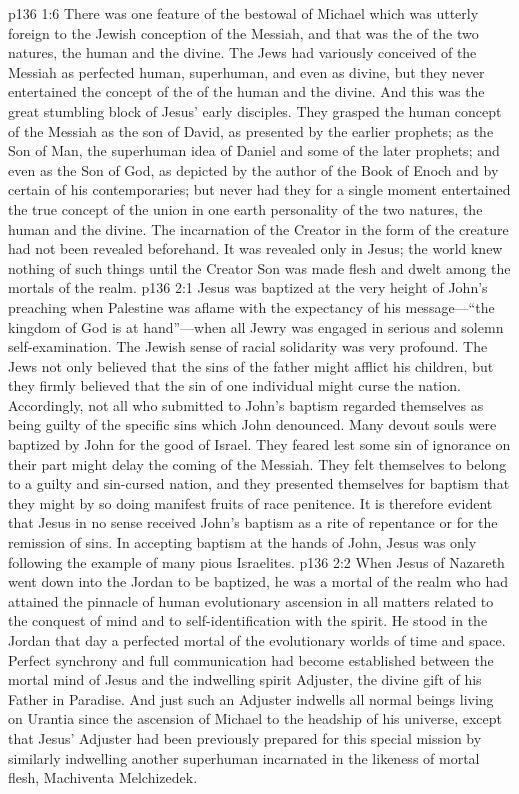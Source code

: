 \vs p136 1:6 There was one feature of the bestowal of Michael which was utterly foreign to the Jewish conception of the Messiah, and that was the  of the two natures, the human and the divine. The Jews had variously conceived of the Messiah as perfected human, superhuman, and even as divine, but they never entertained the concept of the  of the human and the divine. And this was the great stumbling block of Jesus’ early disciples. They grasped the human concept of the Messiah as the son of David, as presented by the earlier prophets; as the Son of Man, the superhuman idea of Daniel and some of the later prophets; and even as the Son of God, as depicted by the author of the Book of Enoch and by certain of his contemporaries; but never had they for a single moment entertained the true concept of the union in one earth personality of the two natures, the human and the divine. The incarnation of the Creator in the form of the creature had not been revealed beforehand. It was revealed only in Jesus; the world knew nothing of such things until the Creator Son was made flesh and dwelt among the mortals of the realm.\plusone
{}
\vs p136 2:1 Jesus was baptized at the very height of John’s preaching when Palestine was aflame with the expectancy of his message---“the kingdom of God is at hand”---when all Jewry was engaged in serious and solemn self\hyp{}examination. The Jewish sense of racial solidarity was very profound. The Jews not only believed that the sins of the father might afflict his children, but they firmly believed that the sin of one individual might curse the nation. Accordingly, not all who submitted to John’s baptism regarded themselves as being guilty of the specific sins which John denounced. Many devout souls were baptized by John for the good of Israel. They feared lest some sin of ignorance on their part might delay the coming of the Messiah. They felt themselves to belong to a guilty and sin\hyp{}cursed nation, and they presented themselves for baptism that they might by so doing manifest fruits of race penitence. It is therefore evident that Jesus in no sense received John’s baptism as a rite of repentance or for the remission of sins. In accepting baptism at the hands of John, Jesus was only following the example of many pious Israelites.
\pc \vs p136 2:2 When Jesus of Nazareth went down into the Jordan to be baptized, he was a mortal of the realm who had attained the pinnacle of human evolutionary ascension in all matters related to the conquest of mind and to self\hyp{}identification with the spirit. He stood in the Jordan that day a perfected mortal of the evolutionary worlds of time and space. Perfect synchrony and full communication had become established between the mortal mind of Jesus and the indwelling spirit Adjuster, the divine gift of his Father in Paradise. And just such an Adjuster indwells all normal beings living on Urantia since the ascension of Michael to the headship of his universe, except that Jesus’ Adjuster had been previously prepared for this special mission by similarly indwelling another superhuman incarnated in the likeness of mortal flesh, Machiventa Melchizedek.
